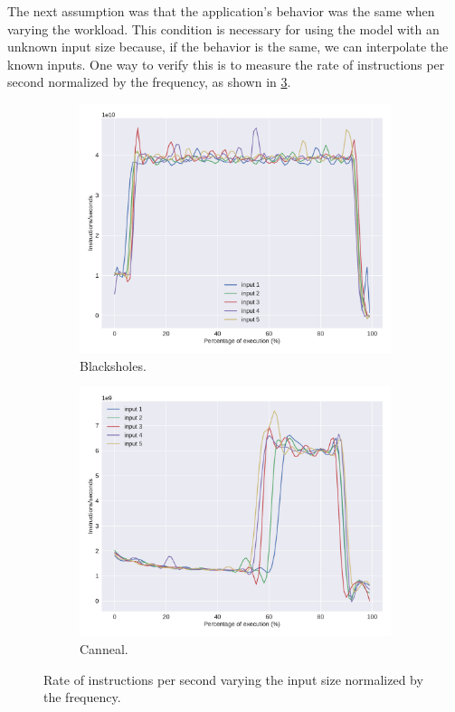 The next assumption was that the application's behavior was the same when varying the workload. This condition is necessary for using the model with an unknown input size because, if the behavior is the same, we can interpolate the known inputs. One way to verify this is to measure the rate of instructions per second normalized by the frequency, as shown in \cref{fig:fingerpritns}.
\begin{figure}[H]
	\centering
	\captionsetup[subfigure]{justification=centering}
	
	\begin{subfigure}[b]{0.45\textwidth}
		\includegraphics[width=\columnwidth]{models/figures/hypothesis/input_instructions/fp/blackscholes.pdf}
		\caption{Blacksholes.}
		\label{fig:fp_baclscholes}
	\end{subfigure}
	\begin{subfigure}[b]{0.45\textwidth}
		\includegraphics[width=\columnwidth]{models/figures/hypothesis/input_instructions/fp/canneal.pdf}
		\caption{Canneal.}
		\label{fig:fp_canneal}
	\end{subfigure}
	
	\hfill
	\caption{Rate of instructions per second varying the input size normalized by the frequency.}
	\label{fig:fingerpritns}
\end{figure}

